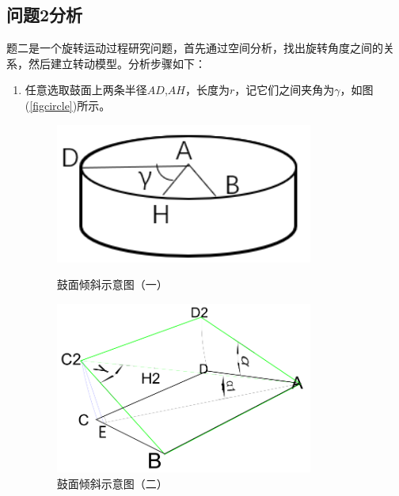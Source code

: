 \documentclass{cumcm}
\begin{document}
\subsection{问题2分析}
题二是一个旋转运动过程研究问题，首先通过空间分析，找出旋转角度之间的关系，然后建立转动模型。分析步骤如下：
\begin{enumerate}
\item 任意选取鼓面上两条半径$AD$,$AH$，长度为$r$，记它们之间夹角为$\gamma$，如图(\ref{figcircle})所示。
\begin{figure}[H]
  \begin{minipage}[t]{0.5\linewidth}   
    \centering   
    \includegraphics[width=0.8\textwidth]{img/circle.png}   
    \caption{鼓面倾斜示意图（一）}   
    \label{figcircle}   
  \end{minipage}   
   \begin{minipage}[t]{0.5\linewidth}   
      \centering   
      \includegraphics[width=0.8\textwidth]{img/change.png}   
      \caption{鼓面倾斜示意图（二）}   
      \label{fig:change}   
    \end{minipage} 
\end{figure}


\end{enumerate}
\end{document}
